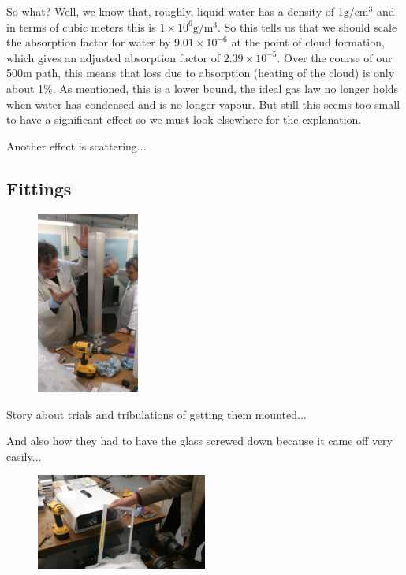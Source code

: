 So what? Well, we know that, roughly, liquid water has a density of
1$\text{g}/\text{cm}^3$ and in terms of cubic meters this is $1\times
10^6\text{g}/\text{m}^3$. So this tells us that we should scale the
absorption factor for water by $9.01\times 10^{-6}$ at the point of
cloud formation, which gives an adjusted absorption factor of
$2.39\times 10^{-5}$. Over the course of our 500m path, this means
that loss due to absorption (heating of the cloud) is only about
1\%. As mentioned, this is a lower bound, the ideal gas law no longer
holds when water has condensed and is no longer vapour. But still this
seems too small to have a significant effect so we must look elsewhere
for the explanation.

Another effect is scattering...

\clearpage
\subsection{Fittings}
\label{sec:fittings}

\begin{figure}
  \includegraphics[angle=-90,width=0.3\textwidth]{tada}
\end{figure}
Story about trials and tribulations of getting them mounted...

And also how they had to have the glass screwed down because it came
off very easily...

\begin{figure}[h]
  \begin{center}
    \includegraphics[width=0.5\textwidth]{faulty}
  \end{center}
\end{figure}

